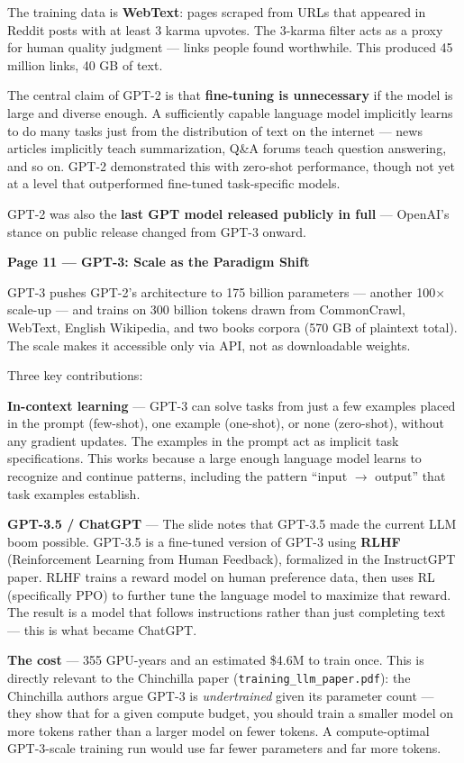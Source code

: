 The training data is \textbf{WebText}: pages scraped from URLs that appeared in Reddit posts with at least 3 karma upvotes. The 3-karma filter acts as a proxy for human quality judgment --- links people found worthwhile. This produced 45 million links, 40 GB of text.

The central claim of GPT-2 is that \textbf{fine-tuning is unnecessary} if the model is large and diverse enough. A sufficiently capable language model implicitly learns to do many tasks just from the distribution of text on the internet --- news articles implicitly teach summarization, Q\&A forums teach question answering, and so on. GPT-2 demonstrated this with zero-shot performance, though not yet at a level that outperformed fine-tuned task-specific models.

GPT-2 was also the \textbf{last GPT model released publicly in full} --- OpenAI's stance on public release changed from GPT-3 onward.

\medskip
\noindent\textbf{Page 11 --- GPT-3: Scale as the Paradigm Shift}

GPT-3 pushes GPT-2's architecture to 175 billion parameters --- another 100$\times$ scale-up --- and trains on 300 billion tokens drawn from CommonCrawl, WebText, English Wikipedia, and two books corpora (570 GB of plaintext total). The scale makes it accessible only via API, not as downloadable weights.

Three key contributions:

\noindent\textbf{In-context learning} --- GPT-3 can solve tasks from just a few examples placed in the prompt (few-shot), one example (one-shot), or none (zero-shot), without any gradient updates. The examples in the prompt act as implicit task specifications. This works because a large enough language model learns to recognize and continue patterns, including the pattern ``input $\to$ output'' that task examples establish.

\noindent\textbf{GPT-3.5 / ChatGPT} --- The slide notes that GPT-3.5 made the current LLM boom possible. GPT-3.5 is a fine-tuned version of GPT-3 using \textbf{RLHF} (Reinforcement Learning from Human Feedback), formalized in the InstructGPT paper. RLHF trains a reward model on human preference data, then uses RL (specifically PPO) to further tune the language model to maximize that reward. The result is a model that follows instructions rather than just completing text --- this is what became ChatGPT.

\noindent\textbf{The cost} --- 355 GPU-years and an estimated \$4.6M to train once. This is directly relevant to the Chinchilla paper (\texttt{training\_llm\_paper.pdf}): the Chinchilla authors argue GPT-3 is \textit{undertrained} given its parameter count --- they show that for a given compute budget, you should train a smaller model on more tokens rather than a larger model on fewer tokens. A compute-optimal GPT-3-scale training run would use far fewer parameters and far more tokens.

